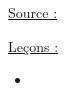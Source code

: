 

\pagestyle{fancy}

\fancyhead[C]{}
\fancyhead[R]{}



\underline{Source :} 

\underline{Leçons :}
\begin{itemize}
\item 
\end{itemize}


